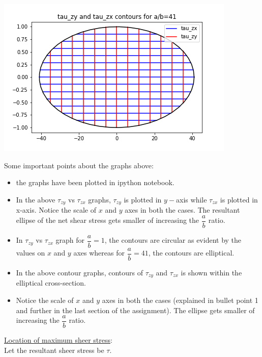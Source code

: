 \documentclass{article}
\begin{document}
\begin{center}
\includegraphics[scale=1]{AE238_A3_4.png}\\

\end{center}

\noindent Some important points about the graphs above:\\
\begin{itemize}
\item the graphs have been plotted in ipython notebook. 

\item In the above $\tau_{zy}$ vs $\tau_{zx}$ graphs, $\tau_{zy}$ is plotted in $y-$axis while $\tau_{zx}$ is plotted in x-axis. Notice the scale of $x$ and $y$ axes in both the cases. The resultant ellipse of the net shear stress gets smaller of increasing the $\dfrac{a}{b}$ ratio. \\
\item In $\tau_{zy}$ vs $\tau_{zx}$ graph for $\dfrac{a}{b}=1$, the contours are circular as evident by the values on $x$ and $y$ axes whereas for $\dfrac{a}{b}=41$, the contours are elliptical.  
\item In the above contour graphs, contours of $\tau_{zy}$ and $\tau_{zx}$ is shown within the elliptical cross-section. \\
\item Notice the scale of $x$ and $y$ axes in both the cases (explained in bullet point 1 and further in the last section of the assignment). The ellipse gets smaller of increasing the $\dfrac{a}{b}$ ratio. \\

\end{itemize}
\bigbreak
\noindent \underline{Location of maximum sheer stress}:\\

\noindent Let the resultant sheer stress be $\tau$.\\
\end{document}
